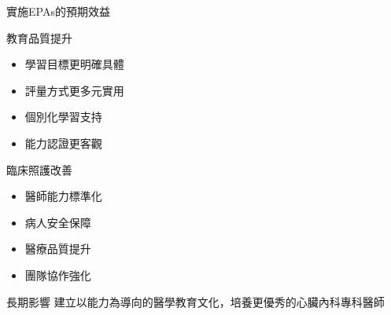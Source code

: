 \documentclass[aspectratio=169]{beamer}
\begin{document}
\begin{frame}{實施EPAs的預期效益}
\begin{block}{教育品質提升}
\begin{itemize}
\item 學習目標更明確具體
\item 評量方式更多元實用
\item 個別化學習支持
\item 能力認證更客觀
\end{itemize}
\end{block}

\begin{block}{臨床照護改善}
\begin{itemize}
\item 醫師能力標準化
\item 病人安全保障
\item 醫療品質提升
\item 團隊協作強化
\end{itemize}
\end{block}

\begin{alertblock}{長期影響}
建立以能力為導向的醫學教育文化，培養更優秀的心臟內科專科醫師
\end{alertblock}
\end{frame}
\end{document}
